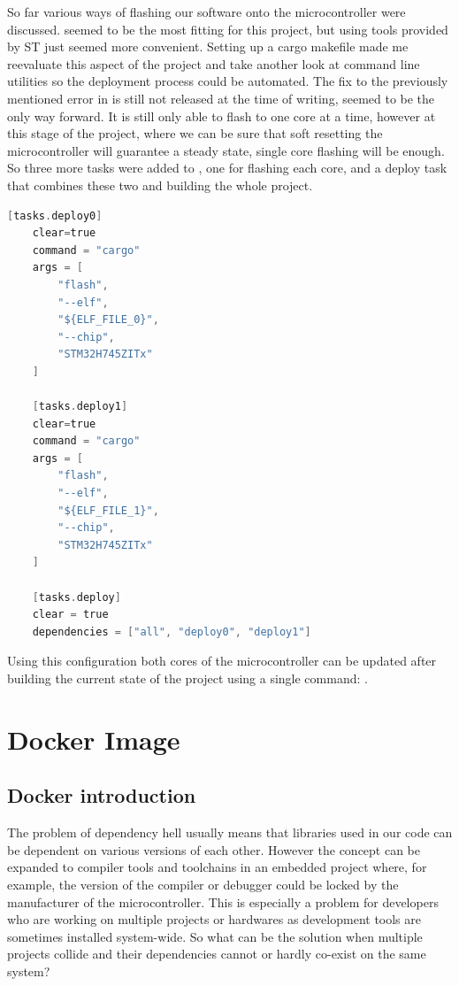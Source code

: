 So far various ways of flashing our software onto the microcontroller were discussed.  seemed to be the most fitting for this project, but using tools provided by ST just seemed more convenient. Setting up a cargo makefile made me reevaluate this aspect of the project and take another look at command line utilities so the deployment process could be automated. The fix to the previously mentioned error in  is still not released at the time of writing,  seemed to be the only way forward. It is still only able to flash to one core at a time, however at this stage of the project, where we can be sure that soft resetting the microcontroller will guarantee a steady state, single core flashing will be enough. So three more tasks were added to , one for flashing each core, and a deploy task that combines these two and building the whole project.

\begin{lstlisting}[language=C,frame=single,float=!ht,label={lst:cargo-make-deploy},caption={Cargo Tasks to Flash the MCU}]
    [tasks.deploy0]
    clear=true
    command = "cargo"
    args = [
        "flash",
        "--elf",
        "${ELF_FILE_0}",
        "--chip",
        "STM32H745ZITx"
    ]

    [tasks.deploy1]
    clear=true
    command = "cargo"
    args = [
        "flash",
        "--elf",
        "${ELF_FILE_1}",
        "--chip",
        "STM32H745ZITx"
    ]

    [tasks.deploy]
    clear = true
    dependencies = ["all", "deploy0", "deploy1"]
\end{lstlisting}

Using this configuration both cores of the microcontroller can be updated after building the current state of the project using a single command: .

\section{Docker Image}

\subsection{Docker introduction}
The problem of dependency hell \cite{DependencyHell} usually means that libraries used in our code can be dependent on various versions of each other. However the concept can be expanded to compiler tools and toolchains in an embedded project where, for example, the version of the compiler or debugger could be locked by the manufacturer of the microcontroller. This is especially a problem for developers who are working on multiple projects or hardwares as development tools are sometimes installed system-wide. So what can be the solution when multiple projects collide and their dependencies cannot or hardly co-exist on the same system?

